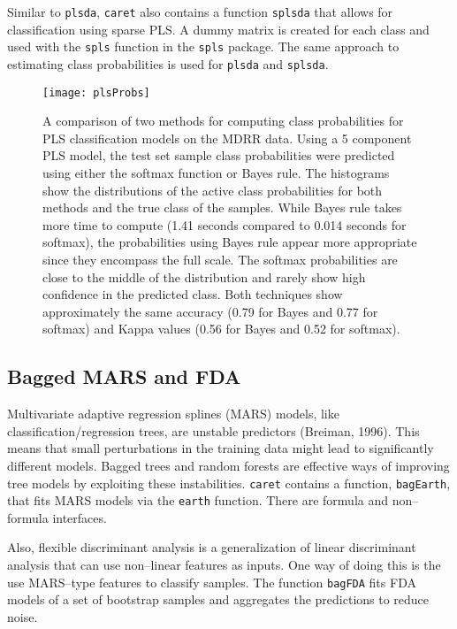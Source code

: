 \documentclass[12pt]{article}
\begin{document}
Similar to \texttt{plsda}, \texttt{caret} also contains a function \texttt{splsda} that allows for classification using sparse PLS. A dummy 
matrix is created for each class and used with the \texttt{spls} function in the \texttt{spls} package. The same approach to estimating class probabilities is used for \texttt{plsda} and \texttt{splsda}.


\begin{figure}
   \begin{center}		
      \texttt{[image: plsProbs]}
\caption{A comparison of two methods for computing class probabilities for PLS classification models on the MDRR data. Using a 5 component PLS model, the test set sample class probabilities were predicted using either the softmax function or Bayes rule. The histograms show the distributions of the active class probabilities for both methods and the true class of the samples. While Bayes rule takes more time to compute (1.41 seconds compared to 0.014 seconds for softmax), the probabilities using Bayes rule appear more appropriate since they encompass the full scale. The softmax probabilities are close to the middle of the distribution and rarely show high confidence in the predicted class. Both techniques show approximately the same accuracy (0.79 for Bayes and 0.77 for softmax) and Kappa values (0.56 for Bayes and 0.52 for softmax).}
      \label{f:plsProbs}       
   \end{center}
\end{figure}  

\subsection{Bagged MARS and FDA}

Multivariate adaptive regression splines (MARS) models, like classification/regression trees, are unstable predictors (Breiman, 1996). This means that small perturbations in the training data might lead to significantly different models. Bagged trees and random forests are effective ways of improving tree models by exploiting these instabilities. \texttt{caret} contains a function, \texttt{bagEarth}, that fits MARS models via the \texttt{earth} function. There are formula and non--formula interfaces. 

Also, flexible discriminant analysis is a generalization of linear discriminant analysis that can use non--linear features as inputs. One way of doing this is the use MARS--type features to classify samples. The function \texttt{bagFDA} fits FDA models of a set of bootstrap samples and aggregates the predictions to reduce noise.  
\end{document}
